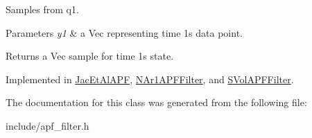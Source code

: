Samples from q1. 


\begin{DoxyParams}{Parameters}
{\em y1} & a Vec representing time 1\textquotesingle{}s data point. \\
\hline
\end{DoxyParams}
\begin{DoxyReturn}{Returns}
a Vec sample for time 1\textquotesingle{}s state. 
\end{DoxyReturn}


Implemented in \hyperlink{classJacEtAlAPF_afdd084c634e7ad591499a6c8c90ee9d0}{Jac\+Et\+Al\+A\+PF}, \hyperlink{classNAr1APFFilter_a294a2044c95ba6e013758fa62f3ef979}{N\+Ar1\+A\+P\+F\+Filter}, and \hyperlink{classSVolAPFFilter_a9da55ac2cfbc51ce0bc65a335942b1b6}{S\+Vol\+A\+P\+F\+Filter}.



The documentation for this class was generated from the following file\+:\begin{DoxyCompactItemize}
\item 
include/apf\+\_\+filter.\+h\end{DoxyCompactItemize}
